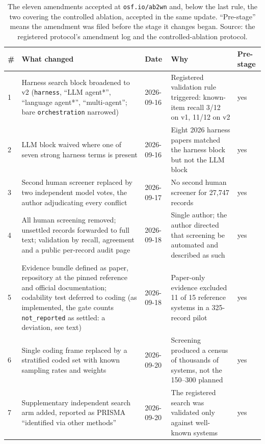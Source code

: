 \begin{table}[t]
  \small
  \caption{The eleven amendments accepted at \texttt{osf.io/ab2wn} and, below the last rule, the two covering
  the controlled ablation, accepted in the same update. ``Pre-stage'' means the amendment was filed before the stage it changes began. Source:
  the registered protocol's amendment log and the controlled-ablation protocol.}
  \label{tab:amendments-full}
  \begin{tabular}{@{}l p{} l p{} l@{}}
    \toprule
    \# & What changed & Date & Why & Pre-stage \\
    \midrule
    1 & Harness search block broadened to v2 (\texttt{harness}, ``LLM agent*'', ``language agent*'',
        ``multi-agent''; bare \texttt{orchestration} narrowed) & 2026-09-16 &
        Registered validation rule triggered: known-item recall 3/12 on v1, 11/12 on v2 & yes \\
    2 & LLM block waived where one of seven strong harness terms is present & 2026-09-16 &
        Eight 2026 harness papers matched the harness block but not the LLM block & yes \\
    3 & Second human screener replaced by two independent model votes, the author adjudicating every
        conflict & 2026-09-17 & No second human screener for 27,747 records & yes \\
    4 & All human screening removed; unsettled records forwarded to full text; validation by recall,
        agreement and a public per-record audit page & 2026-09-18 & Single author; the author directed that
        screening be automated and described as such & yes \\
    5 & Evidence bundle defined as paper, repository at the pinned reference and official documentation;
        codability test deferred to coding (as implemented, the gate counts \texttt{not\_reported} as
        settled: a deviation, see text) & 2026-09-18 & Paper-only evidence excluded 11 of 15 reference
        systems in a 325-record pilot & yes \\
    6 & Single coding frame replaced by a stratified coded set with known sampling rates and weights &
        2026-09-20 & Screening produced a census of thousands of systems, not the 150--300 planned & yes \\
    7 & Supplementary independent search arm added, reported as PRISMA ``identified via other methods'' &
        2026-09-20 & The registered search was validated only against well-known systems & yes \\

\end{tabular}
\end{table}
